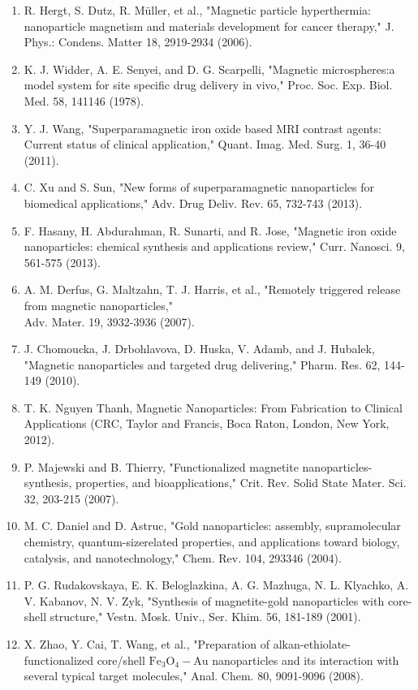 \documentclass[12pt, a4paper]{article}
\begin{document}
\begin{enumerate}
  \item R. Hergt, S. Dutz, R. Müller, et al., "Magnetic particle hyperthermia: nanoparticle magnetism and materials development for cancer therapy," J. Phys.: Condens. Matter 18, 2919-2934 (2006).
  \item K. J. Widder, A. E. Senyei, and D. G. Scarpelli, "Magnetic microspheres:a model system for site specific drug delivery in vivo," Proc. Soc. Exp. Biol. Med. 58, 141146 (1978).
  \item Y. J. Wang, "Superparamagnetic iron oxide based MRI contrast agents: Current status of clinical application," Quant. Imag. Med. Surg. 1, 36-40 (2011).
  \item C. Xu and S. Sun, "New forms of superparamagnetic nanoparticles for biomedical applications," Adv. Drug Deliv. Rev. 65, 732-743 (2013).
  \item F. Hasany, H. Abdurahman, R. Sunarti, and R. Jose, "Magnetic iron oxide nanoparticles: chemical synthesis and applications review," Curr. Nanosci. 9, 561-575 (2013).
  \item A. M. Derfus, G. Maltzahn, T. J. Harris, et al., "Remotely triggered release from magnetic nanoparticles," \\
  Adv. Mater. 19, 3932-3936 (2007).
  \item J. Chomoucka, J. Drbohlavova, D. Huska, V. Adamb, and J. Hubalek, "Magnetic nanoparticles and targeted drug delivering," Pharm. Res. 62, 144-149 (2010).
  \item T. K. Nguyen Thanh, Magnetic Nanoparticles: From Fabrication to Clinical Applications (CRC, Taylor and Francis, Boca Raton, London, New York, 2012).
  \item P. Majewski and B. Thierry, "Functionalized magnetite nanoparticles-synthesis, properties, and bioapplications," Crit. Rev. Solid State Mater. Sci. 32, 203-215 (2007).
  \item M. C. Daniel and D. Astruc, "Gold nanoparticles: assembly, supramolecular chemistry, quantum-sizerelated properties, and applications toward biology, catalysis, and nanotechnology," Chem. Rev. 104, 293346 (2004).
  \item P. G. Rudakovskaya, E. K. Beloglazkina, A. G. Mazhuga, N. L. Klyachko, A. V. Kabanov, N. V. Zyk, "Synthesis of magnetite-gold nanoparticles with core-shell structure," Vestn. Mosk. Univ., Ser. Khim. 56, 181-189 (2001).
  \item X. Zhao, Y. Cai, T. Wang, et al., "Preparation of alkan-ethiolate-functionalized core/shell \(\mathrm{Fe}_{3} \mathrm{O}_{4}-\mathrm{Au}\) nanoparticles and its interaction with several typical target molecules," Anal. Chem. 80, 9091-9096 (2008).

\end{enumerate}
\end{document}
